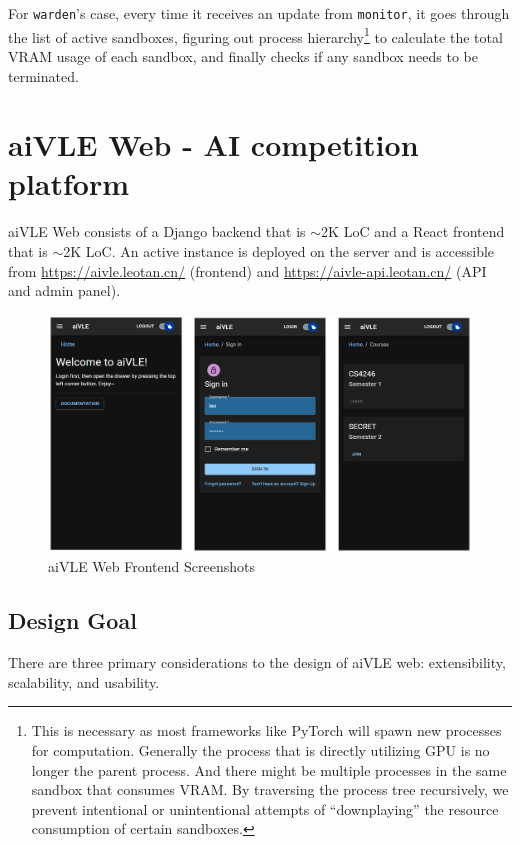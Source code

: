 For \texttt{warden}'s case, every time it receives an update from \texttt{monitor}, it goes through the list of active sandboxes, figuring out process hierarchy\footnote{This is necessary as most frameworks like PyTorch will spawn new processes for computation. Generally the process that is directly utilizing GPU is no longer the parent process. And there might be multiple processes in the same sandbox that consumes VRAM. By traversing the process tree recursively, we prevent intentional or unintentional attempts of ``downplaying'' the resource consumption of certain sandboxes.} to calculate the total VRAM usage of each sandbox, and finally checks if any sandbox needs to be terminated.

\section{aiVLE Web - AI competition platform}
\label{ch:aivle-web}
aiVLE Web consists of a Django backend that is $\sim$2K LoC and a React frontend that is $\sim$2K LoC. An active instance is deployed on the server and is accessible from \href{https://aivle.leotan.cn/}{https://aivle.leotan.cn/} (frontend) and \href{https://aivle-api.leotan.cn/}{https://aivle-api.leotan.cn/} (API and admin panel).

\begin{figure}[H]
    \centering
    \includegraphics[width=\textwidth]{images/aivle-web-frontend-screenshot.png}
    \caption{aiVLE Web Frontend Screenshots}
    \label{fig:aivle-web-frontend-screenshot}
\end{figure}

\subsection{Design Goal}
There are three primary considerations to the design of aiVLE web: extensibility, scalability, and usability. 

